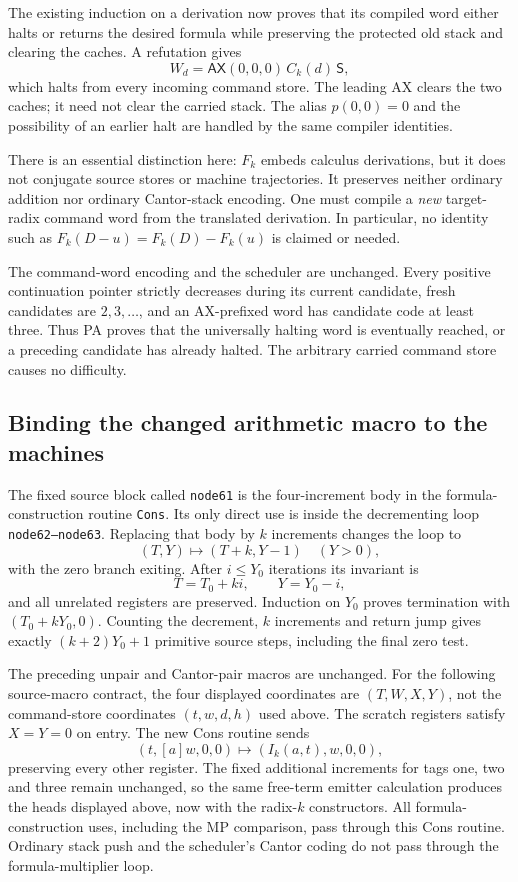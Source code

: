 The existing induction on a derivation now proves that its compiled
word either halts or returns the desired formula while preserving
the protected old stack and clearing the caches. A refutation gives
\[
 W_d=\mathsf{AX}(0,0,0)\,C_k(d)\,\mathsf S,
\]
which halts from every incoming command store. The leading AX clears
the two caches; it need not clear the carried stack. The alias
$p(0,0)=0$ and the possibility of an earlier halt are handled by
the same compiler identities.

There is an essential distinction here: $F_k$ embeds calculus
derivations, but it does not conjugate source stores or machine
trajectories. It preserves neither ordinary addition nor ordinary
Cantor-stack encoding. One must compile a \emph{new} target-radix
command word from the translated derivation. In particular, no
identity such as $F_k(D-u)=F_k(D)-F_k(u)$ is claimed or needed.

The command-word encoding and the scheduler are unchanged. Every
positive continuation pointer strictly decreases during its current
candidate, fresh candidates are $2,3,\ldots$, and an AX-prefixed
word has candidate code at least three. Thus PA proves that the
universally halting word is eventually reached, or a preceding
candidate has already halted. The arbitrary carried command store
causes no difficulty.

\subsection{Binding the changed arithmetic macro to the machines}

The fixed source block called \texttt{node61} is the four-increment
body in the formula-construction routine \texttt{Cons}. Its only
direct use is inside the decrementing loop \texttt{node62--node63}.
Replacing that body by $k$ increments changes the loop to
\[
 (T,Y)\longmapsto(T+k, Y-1)\quad(Y>0),
\]
with the zero branch exiting. After $i\leq Y_0$ iterations its
invariant is
\[
 T=T_0+ki,\qquad Y=Y_0-i,
\]
and all unrelated registers are preserved. Induction on $Y_0$
proves termination with $(T_0+kY_0,0)$. Counting the decrement,
$k$ increments and return jump gives exactly
$(k+2)Y_0+1$ primitive source steps, including the final zero test.

The preceding unpair and Cantor-pair macros are unchanged. For the
following source-macro contract, the four displayed coordinates are
$(T,W,X,Y)$, not the command-store coordinates $(t,w,d,h)$ used above.
The scratch registers satisfy $X=Y=0$ on entry. The new Cons routine sends
\[
 (t,[a]w,0,0)\longmapsto(I_k(a,t),w,0,0),
\]
preserving every other register.
The fixed additional increments for tags one, two and three remain
unchanged, so the same free-term emitter calculation produces the
heads displayed above, now with the radix-$k$ constructors. All
formula-construction uses, including the MP comparison, pass through
this Cons routine. Ordinary stack push and the scheduler's Cantor
coding do not pass through the formula-multiplier loop.

